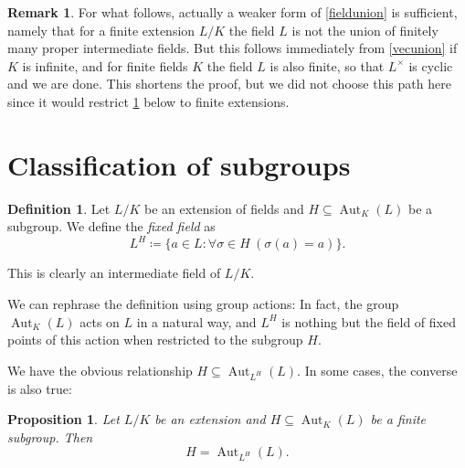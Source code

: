 \documentclass[11pt,reqno]{amsart}
\theoremstyle{standard}
\newtheorem{prop}[lemma]{Proposition}
\theoremstyle{definition}
\newtheorem{defi}[lemma]{Definition}
\newtheorem{rem}[lemma]{Remark}
\DeclareMathOperator{\Aut}{Aut}
\begin{document}
\begin{rem}
For what follows, actually a weaker form of \cref{fieldunion} is sufficient, namely that for a finite extension $L/K$ the field $L$ is not the union of finitely many proper intermediate fields. But this follows immediately from \cref{vecunion} if $K$ is infinite, and for finite fields $K$ the field $L$ is also finite, so that $L^{\times}$ is cyclic and we are done. This shortens the proof, but we did not choose this path here since it would restrict \cref{subgroupclass} below to finite extensions.
\end{rem}



\section{Classification of subgroups}

\begin{defi}
Let $L/K$ be an extension of fields and $H \subseteq \Aut_K(L)$ be a subgroup. We define the \emph{fixed field} as
\[L^H \coloneqq \{a \in L : \forall \sigma \in H ~ (\sigma(a)=a) \}.\]
\end{defi}

This is clearly an intermediate field of $L/K$.

We can rephrase the definition using group actions: In fact, the group $\Aut_K(L)$ acts on $L$ in a natural way, and $L^H$ is nothing but the field of fixed points of this action when restricted to the subgroup $H$.

We have the obvious relationship $H \subseteq \Aut_{L^H}(L)$. In some cases, the converse is also true:

\begin{prop} \label{subgroupclass}
Let $L/K$ be an extension and $H \subseteq \Aut_K(L)$ be a finite subgroup. Then
\[H = \Aut_{L^H}(L).\]
\end{prop}
\end{document}
